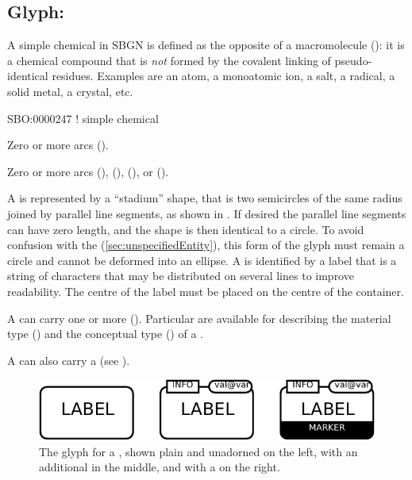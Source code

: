 \subsection{Glyph: }
\label{sec:simpleChemical}

A simple chemical in SBGN is defined as the opposite of a macromolecule (): it is a chemical compound that is \emph{not} formed by the covalent linking of pseudo-identical residues. 
Examples  are an atom, a monoatomic ion, a salt, a radical, a solid metal, a crystal, etc.

\begin{glyphDescription}

\glyphSboTerm
SBO:0000247 ! simple chemical

\glyphIncoming
Zero or more  arcs ().

\glyphOutgoing
Zero or more  arcs (),  (),  (), or  ().

\glyphContainer
A  is represented by a ``stadium'' shape, that is two semicircles of the same radius joined by parallel line segments, as shown in .
If desired the parallel line segments can have zero length, and the shape is then identical to a circle.
To avoid confusion with the  (\ref{sec:unspecifiedEntity}), this form of the glyph must remain a circle and cannot be deformed into an ellipse.
\glyphLabel
A  is identified by a label  that is a string of characters that may be distributed on several lines to improve readability.
The centre of the label must be placed on the centre of the container.

\glyphAux
A  can carry one or more  ().
Particular  are available for describing the material type () and the conceptual type () of a .

A  can also carry a  (see ).

\end{glyphDescription}

\begin{figure}[H]
  \centering
  \includegraphics{images/build/simple_chemical_combined.pdf}
  \caption{The \PD glyph for a , shown plain and unadorned on the left, with an additional  in the middle, and with a  on the right.}
  \label{fig:simpleChemical}
\end{figure}
